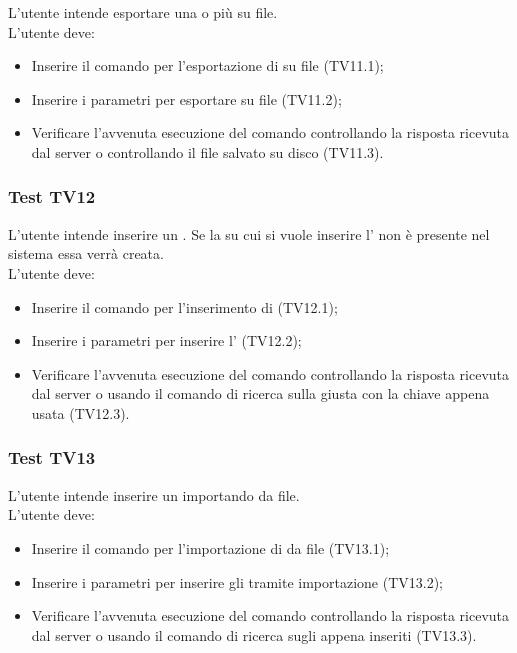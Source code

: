 \documentclass{scalatekids-article}
\begin{document}
L'utente intende esportare una o più  su file.\\
L'utente deve:
\begin{itemize}
\item Inserire il comando per l'esportazione di  su file (TV11.1);
\item Inserire i parametri per esportare  su file (TV11.2);
\item Verificare l'avvenuta esecuzione del comando controllando la risposta ricevuta dal server o controllando il file salvato su disco (TV11.3).
\end{itemize}

\subsubsection{Test TV12}

L'utente intende inserire un . Se la  su cui si 
vuole inserire l' non è presente nel sistema essa verrà creata.\\
L'utente deve:
\begin{itemize}
\item Inserire il comando per l'inserimento di  (TV12.1);
\item Inserire i parametri per inserire l' (TV12.2);
\item Verificare l'avvenuta esecuzione del comando controllando la risposta ricevuta dal server o usando il comando di ricerca sulla  giusta con la chiave appena usata (TV12.3).
\end{itemize}

\subsubsection{Test TV13}

L'utente intende inserire un  importando da file.\\
L'utente deve:
\begin{itemize}
\item Inserire il comando per l'importazione di  da file (TV13.1);
\item Inserire i parametri per inserire gli  tramite importazione (TV13.2);
\item Verificare l'avvenuta esecuzione del comando controllando la risposta ricevuta dal server o usando il comando di ricerca sugli  appena inseriti (TV13.3).
\end{itemize}
\end{document}
